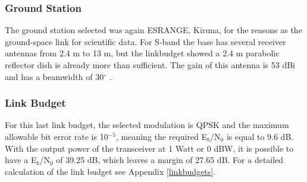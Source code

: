 \subsubsection{Ground Station}
The ground station selected was again ESRANGE, Kiruna, for the reasons as the ground-space link for scientific data. For S-band the base has several receiver antennas from 2.4 m to 13 m, but the linkbudget showed a 2.4 m parabolic reflector dish is already more than sufficient. The gain of this antenna is 53 dBi and has a beamwidth of 30$^{\circ}$ \cite{esrange}.

\subsubsection{Link Budget}
For this last link budget, the selected modulation is QPSK and the maximum allowable bit error rate is 10$^{-5}$, meaning the required E$_{b}$/N$_{0}$ is equal to 9.6 dB. With the output power of the transceiver at 1 Watt or 0 dBW, it is possible to have a E$_{b}$/N$_{0}$ of 39.25 dB, which leaves a margin of 27.65 dB. For a detailed calculation of the link budget see Appendix \ref{linkbudgets}.

